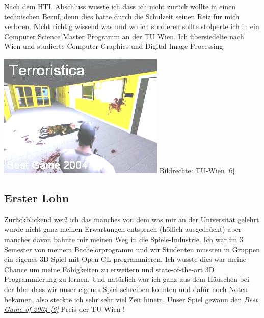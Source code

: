 Nach dem HTL Abschluss wusste ich dass ich nicht zurück wollte in einen technischen Beruf, denn dies hatte durch die Schulzeit seinen Reiz für mich verloren. Nicht richtig wissend was und wo ich studieren sollte stolperte ich in ein Computer Science Master Programm an der TU Wien. Ich übersiedelte nach Wien und studierte Computer Graphics und Digital Image Processing.
\begin{center}
    \includegraphics[width=\linewidth]{austrianguy/austrianguy-bestgame2004.jpg}
    \footnotesize{Bildrechte: \href{http://www.cg.tuwien.ac.at/courses/CG23/HallOfFame/2004/}{TU-Wien [6]}}
\end{center}
\subsection*{Erster Lohn}

Zurückblickend weiß ich das manches von dem was mir an der Universität gelehrt wurde nicht ganz meinen Erwartungen entsprach (höflich ausgedrückt) aber manches davon bahnte mir meinen Weg in die Spiele-Industrie. Ich war im 3. Semester von meinem Bachelorprogramm und wir Studenten mussten in Gruppen ein eigenes 3D Spiel mit Open-GL programmieren. Ich wusste dies war meine Chance um meine Fähigkeiten zu erweitern und state-of-the-art 3D Programmierung zu lernen. Und natürlich war ich ganz aus dem Häuschen bei der Idee dass wir unser eigenes Spiel schreiben konnten und dafür noch Noten bekamen, also steckte ich sehr sehr viel Zeit hinein. Unser Spiel gewann den \href{http://www.cg.tuwien.ac.at/courses/CG23/HallOfFame/2004/}{\textit{Best Game of 2004 [6]}} Preis der TU-Wien !

